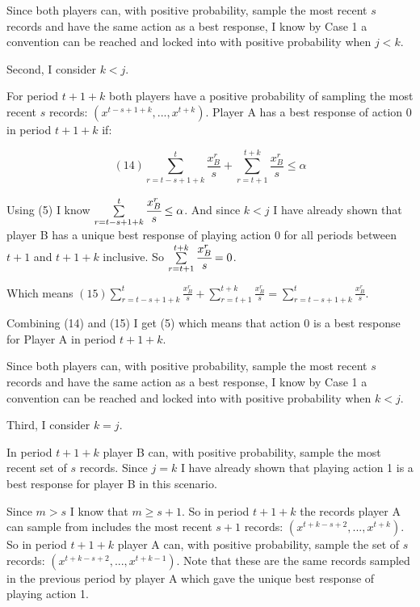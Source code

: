 \documentclass{article}
\begin{document}
\vskip6pt

Since both players can, with positive probability, sample the most recent $s$ records and have the same action as a best response, I know by Case 1 a convention can be reached and locked into with positive probability when $j<k$.

\vskip18pt

Second, I consider $k<j$.

\vskip6pt

For period $t+1+k$ both players have a positive probability of sampling the most recent $s$ records: $(x^{t-s+1+k},...,x^{t+k})$. Player A has a best response of action 0 in period $t+1+k$ if:

$$(14) \sum\limits_{r=t-s+1+k}^{t}\frac{x^r_B}{s}+\sum\limits_{r=t+1}^{t+k} \frac{x^r_B}{s} \leq \alpha$$

Using (5) I know $\sum\limits_{r=t-s+1+k}^{t}\cfrac{x^r_B}{s} \leq \alpha$. And since $k<j$ I have already shown that player B has a unique best response of playing action 0 for all periods between $t+1$ and $t+1+k$ inclusive. So $\sum\limits_{r=t+1}^{t+k} \cfrac{x^r_B}{s}=0$.

Which means $(15) \sum\limits_{r=t-s+1+k}^{t}\frac{x^r_B}{s}+\sum\limits_{r=t+1}^{t+k} \frac{x^r_B}{s}=\sum\limits_{r=t-s+1+k}^{t}\frac{x^r_B}{s}$.

Combining (14) and (15) I get (5) which means that action 0 is a best response for Player A in period $t+1+k$.

\vskip6pt

Since both players can, with positive probability, sample the most recent $s$ records and have the same action as a best response, I know by Case 1 a convention can be reached and locked into with positive probability when $k<j$.

\vskip18pt

Third, I consider $k=j$.

\vskip6pt

In period $t+1+k$ player B can, with positive probability, sample the most recent set of $s$ records. Since $j=k$ I have already shown that playing action 1 is a best response for player B in this scenario.

\vskip6pt

Since $m>s$ I know that $m \geq s+1$. So in period $t+1+k$ the records player A can sample from includes the most recent $s+1$ records: $(x^{t+k-s+2},...,x^{t+k})$. So in period $t+1+k$ player A can, with positive probability, sample the set of $s$ records: $(x^{t+k-s+2},...,x^{t+k-1})$. Note that these are the same records sampled in the previous period by player A which gave the unique best response of playing action 1.
\end{document}
